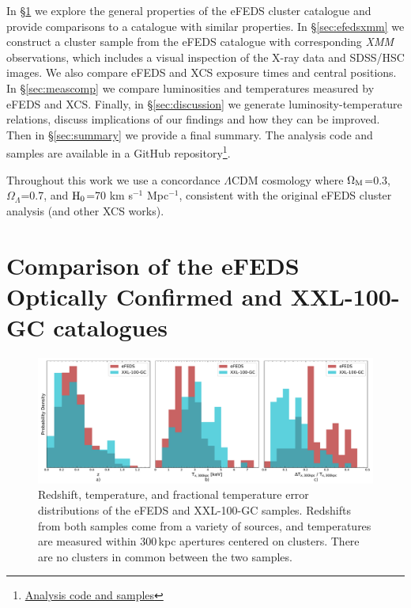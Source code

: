 \documentclass[fleqn,usenatbib]{mnras}
\begin{document}
In \S\ref{sec:efedsproperties} we explore the general properties of the eFEDS cluster catalogue and provide comparisons to a catalogue with similar properties. In \S\ref{sec:efedsxmm} we construct a cluster sample from the eFEDS catalogue with corresponding {\em XMM} observations, which includes a visual inspection of the X-ray data and SDSS/HSC images. We also compare eFEDS and XCS exposure times and central positions. In \S\ref{sec:meascomp} we compare luminosities and temperatures measured by eFEDS and XCS. Finally, in \S\ref{sec:discussion} we generate luminosity-temperature relations, discuss implications of our findings and how they can be improved. Then in \S\ref{sec:summary} we provide a final summary. The analysis code and samples are available in a GitHub repository\footnote{\href{https://github.com/DavidT3/eFEDS-XCS-Paper}{Analysis code and samples}}.

Throughout this work we use a concordance $\Lambda$CDM cosmology where $\Omega_{\rm{M}}$=0.3, $\Omega_{\Lambda}$=0.7, and $\rm{H}_{0}$=70 km s$^{-1}$ Mpc$^{-1}$, consistent with the original eFEDS cluster analysis (and other XCS works).

\section{Comparison of the \lowercase{e}FEDS Optically Confirmed and XXL-100-GC catalogues}
\label{sec:efedsproperties}

\begin{figure}
    \centering
    \includegraphics[width=1.0\textwidth]{images/efeds_xxl_z+t+t_frac.pdf}
    \caption[]{Redshift, temperature, and fractional temperature error distributions of the eFEDS and XXL-100-GC samples. Redshifts from both samples come from a variety of sources, and temperatures are measured within 300\,kpc apertures centered on clusters. There are no clusters in common between the two samples.} 
    \label{fig:xxlefeds}
\end{figure}
\end{document}
